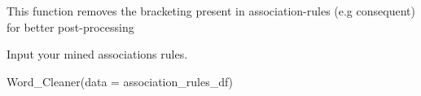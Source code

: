 \documentclass[a4paper]{book}
\begin{document}
%
\begin{Description}\relax
This function removes the bracketing present in association-rules (e.g consequent) for better post-processing
\end{Description}
%
\begin{Arguments}
\begin{ldescription}
\item[\code{data}] Input your mined associations rules.
\end{ldescription}
\end{Arguments}
%
\begin{Examples}
\begin{ExampleCode}
Word_Cleaner(data = association_rules_df)
\end{ExampleCode}
\end{Examples}
\printindex{}
\end{document}
